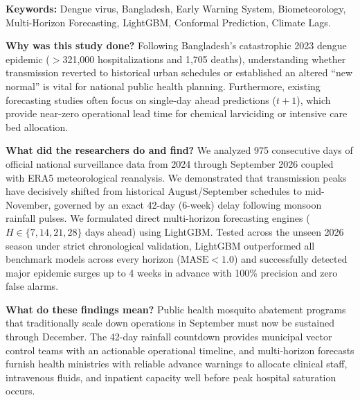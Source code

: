 \documentclass[11pt,a4paper]{article}
\begin{document}
\begin{abstract}
\vspace{0.5em}
\noindent\textbf{Conclusions/Significance:} Dengue in Bangladesh has transitioned into a delayed-peak, hyperendemic regime governed by monsoon precipitation pulses operating on a 6-week biometeorological countdown. Coupling meteorological lags with multi-horizon machine learning provides an actionable 2-to-4-week early warning window for municipal vector control and clinical hospital surge mobilization with zero false-alarm risk.
\end{abstract}

\vspace{0.5em}
\noindent\textbf{Keywords:} Dengue virus, Bangladesh, Early Warning System, Biometeorology, Multi-Horizon Forecasting, LightGBM, Conformal Prediction, Climate Lags.

\vspace{1em}
\begin{tcolorbox}[colback=blue!5!white,colframe=blue!75!black,title=\textbf{Author Summary}]
\textbf{Why was this study done?}
Following Bangladesh's catastrophic 2023 dengue epidemic ($>$321,000 hospitalizations and 1,705 deaths), understanding whether transmission reverted to historical urban schedules or established an altered ``new normal'' is vital for national public health planning. Furthermore, existing forecasting studies often focus on single-day ahead predictions ($t+1$), which provide near-zero operational lead time for chemical larviciding or intensive care bed allocation.

\vspace{0.5em}
\textbf{What did the researchers do and find?}
We analyzed 975 consecutive days of official national surveillance data from 2024 through September 2026 coupled with ERA5 meteorological reanalysis. We demonstrated that transmission peaks have decisively shifted from historical August/September schedules to mid-November, governed by an exact 42-day (6-week) delay following monsoon rainfall pulses. We formulated direct multi-horizon forecasting engines ($H \in \{7, 14, 21, 28\}$ days ahead) using LightGBM. Tested across the unseen 2026 season under strict chronological validation, LightGBM outperformed all benchmark models across every horizon ($\text{MASE} < 1.0$) and successfully detected major epidemic surges up to 4 weeks in advance with 100\% precision and zero false alarms.

\vspace{0.5em}
\textbf{What do these findings mean?}
Public health mosquito abatement programs that traditionally scale down operations in September must now be sustained through December. The 42-day rainfall countdown provides municipal vector control teams with an actionable operational timeline, and multi-horizon forecasts furnish health ministries with reliable advance warnings to allocate clinical staff, intravenous fluids, and inpatient capacity well before peak hospital saturation occurs.
\end{tcolorbox}
\end{document}
